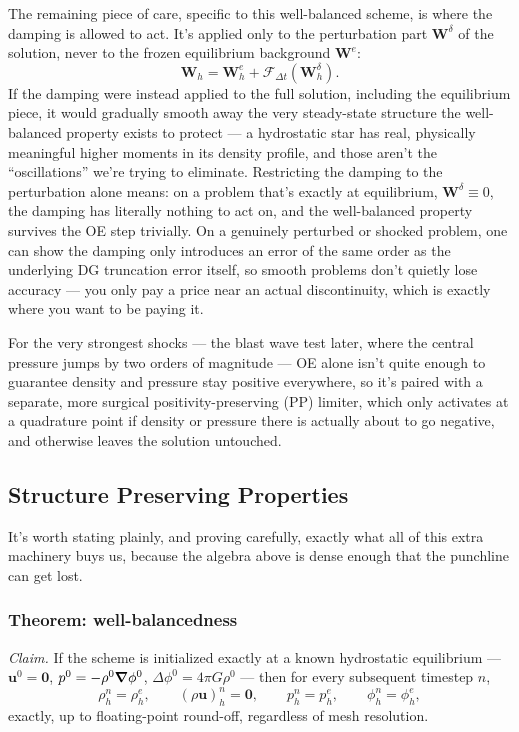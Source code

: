 The remaining piece of care, specific to this well-balanced scheme, is where the damping is allowed to act. It's applied only to the perturbation part $\mathbf{W}^\delta$ of the solution, never to the frozen equilibrium background $\mathbf{W}^e$:
\[
	\mathbf{W}_h = \mathbf{W}_h^e + \mathcal{F}_{\Delta t}(\mathbf{W}_h^\delta).
\]
If the damping were instead applied to the full solution, including the equilibrium piece, it would gradually smooth away the very steady-state structure the well-balanced property exists to protect — a hydrostatic star has real, physically meaningful higher moments in its density profile, and those aren't the ``oscillations'' we're trying to eliminate. Restricting the damping to the perturbation alone means: on a problem that's exactly at equilibrium, $\mathbf{W}^\delta \equiv 0$, the damping has literally nothing to act on, and the well-balanced property survives the OE step trivially. On a genuinely perturbed or shocked problem, one can show the damping only introduces an error of the same order as the underlying DG truncation error itself, so smooth problems don't quietly lose accuracy — you only pay a price near an actual discontinuity, which is exactly where you want to be paying it.

For the very strongest shocks — the blast wave test later, where the central pressure jumps by two orders of magnitude — OE alone isn't quite enough to guarantee density and pressure stay positive everywhere, so it's paired with a separate, more surgical positivity-preserving (PP) limiter, which only activates at a quadrature point if density or pressure there is actually about to go negative, and otherwise leaves the solution untouched.

\subsection{Structure Preserving Properties}

It's worth stating plainly, and proving carefully, exactly what all of this extra machinery buys us, because the algebra above is dense enough that the punchline can get lost.

\subsubsection{Theorem: well-balancedness}

\emph{Claim.} If the scheme is initialized exactly at a known hydrostatic equilibrium — $\mathbf{u}^0 = \mathbf{0}$, $p^0 = -\rho^0\grad\phi^0$, $\Delta\phi^0 = 4\pi G\rho^0$ — then for every subsequent timestep $n$,
\[
	\rho_h^n = \rho_h^e, \qquad (\rho\mathbf{u})_h^n = \mathbf{0}, \qquad p_h^n = p_h^e, \qquad \phi_h^n = \phi_h^e,
\]
exactly, up to floating-point round-off, regardless of mesh resolution.

